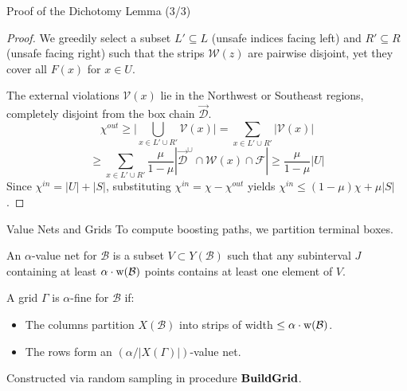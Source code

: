 \documentclass[11pt,aspectratio=169]{beamer}
\newcommand{\width}{{\bf {\rm  w}}}
\newcommand{\buildgrid}{{\rm {\bf BuildGrid}}}
\begin{document}
\begin{frame}{Proof of the Dichotomy Lemma (3/3)}
    \begin{proof}
        We greedily select a subset $L' \subseteq L$ (unsafe indices facing left) and $R' \subseteq R$ (unsafe facing right) such that the strips $\mathcal{W}(z)$ are pairwise disjoint, yet they cover all $F(x)$ for $x \in U$.
        
        The external violations $\mathcal{V}(x)$ lie in the Northwest or Southeast regions, completely disjoint from the box chain $\vec{\mathcal{D}}$. 
        $$\chi^{out} \geq \Big| \bigcup_{x \in L' \cup R'} \mathcal{V}(x) \Big| = \sum_{x \in L' \cup R'} |\mathcal{V}(x)|$$
        $$\geq \sum_{x \in L' \cup R'} \frac{\mu}{1-\mu} |\vec{\mathcal{D}}^\cup \cap \mathcal{W}(x) \cap \mathcal{F}| \geq \frac{\mu}{1-\mu} |U|$$
        Since $\chi^{in} = |U| + |S|$, substituting $\chi^{in} = \chi - \chi^{out}$ yields $\chi^{in} \leq (1-\mu)\chi + \mu|S|$.
    \end{proof}
\end{frame}

\begin{frame}{Value Nets and Grids}
    To compute boosting paths, we partition terminal boxes.
    
    \begin{definition}
        An $\alpha$-value net for $\mathcal{B}$ is a subset $V \subset Y(\mathcal{B})$ such that any subinterval $J$ containing at least $\alpha \cdot \width(\mathcal{B})$ points contains at least one element of $V$.
    \end{definition}
    
    \begin{definition}
        A grid $\Gamma$ is $\alpha$-fine for $\mathcal{B}$ if:
        \begin{itemize}
            \item The columns partition $X(\mathcal{B})$ into strips of width $\leq \alpha \cdot \width(\mathcal{B})$.
            \item The rows form an $(\alpha / |X(\Gamma)|)$-value net.
        \end{itemize}
    \end{definition}
    Constructed via random sampling in procedure $\buildgrid$.
\end{frame}
\end{document}
